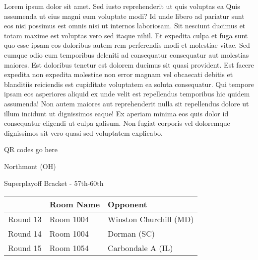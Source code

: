 \documentclass{article}%
\begin{document}
\vspace*{8pt}%
\linebreak%
\newline%
\newline%
Lorem ipsum dolor sit amet. Sed iusto reprehenderit ut quis voluptas ea Quis assumenda ut eius magni eum voluptate modi? Id unde libero ad pariatur sunt eos nisi possimus est omnis nisi ut internos laboriosam. Sit nesciunt ducimus et totam maxime est voluptas vero sed itaque nihil. Et expedita culpa et fuga sunt quo esse ipsam eos doloribus autem rem perferendis modi et molestiae vitae.\newline%
\newline%
Sed cumque odio eum temporibus deleniti ad consequatur consequatur aut molestias maiores. Est doloribus tenetur est dolorem ducimus sit quasi provident. Est facere expedita non expedita molestiae non error magnam vel obcaecati debitis et blanditiis reiciendis est cupiditate voluptatem ea soluta consequatur. Qui tempore ipsam eos asperiores aliquid ex unde velit est repellendus temporibus hic quidem assumenda!\newline%
\newline%
Non autem maiores aut reprehenderit nulla sit repellendus dolore ut illum incidunt ut dignissimos eaque! Ex aperiam minima eos quis dolor id consequatur eligendi ut culpa galisum. Non fugiat corporis vel doloremque dignissimos sit vero quasi sed voluptatem explicabo.\newline%
\newline%
%
\vspace*{30pt}%
\begin{center}%
\begin{Huge}%
QR codes go here%
\end{Huge}%
\end{center}%
\newpage%
\begin{center}%
\begin{Huge}%
Northmont (OH)%
\end{Huge}%
\vspace*{8pt}%
\linebreak%
\begin{Large}%
Superplayoff Bracket {-} 57th{-}60th%
\end{Large}%
\end{center}%
%
\begin{tabularx}{\textwidth}{|c|Y|Y|}%
\hline%
&Room Name&Opponent\\%
\hline%
Round 13&Room 1004&Winston Churchill (MD)\\%
Round 14&Room 1004&Dorman (SC)\\%
Round 15&Room 1054&Carbondale A (IL)\\%
\hline%
\end{tabularx}%
\end{document}
